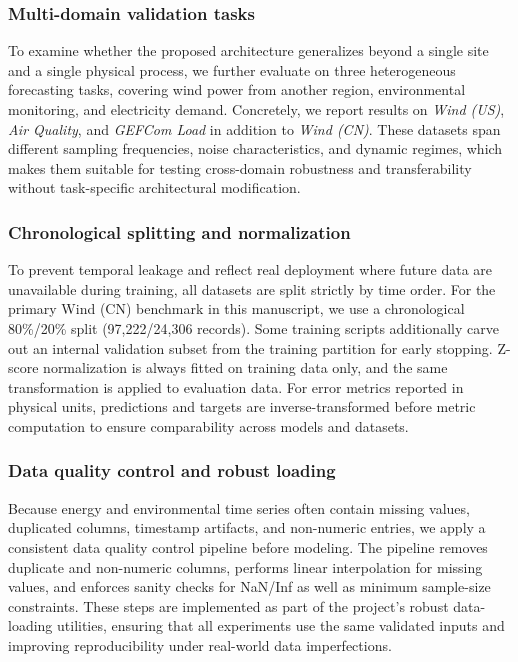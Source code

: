 \documentclass[review,3p,times]{elsarticle}
\begin{document}
\subsubsection{Multi-domain validation tasks}
To examine whether the proposed architecture generalizes beyond a single site and a single physical process, we further evaluate on three heterogeneous forecasting tasks, covering wind power from another region, environmental monitoring, and electricity demand. Concretely, we report results on \emph{Wind (US)}, \emph{Air Quality}, and \emph{GEFCom Load} in addition to \emph{Wind (CN)}. These datasets span different sampling frequencies, noise characteristics, and dynamic regimes, which makes them suitable for testing cross-domain robustness and transferability without task-specific architectural modification.

\subsubsection{Chronological splitting and normalization}
To prevent temporal leakage and reflect real deployment where future data are unavailable during training, all datasets are split strictly by time order. For the primary Wind (CN) benchmark in this manuscript, we use a chronological 80\%/20\% split (97,222/24,306 records). Some training scripts additionally carve out an internal validation subset from the training partition for early stopping. Z-score normalization is always fitted on training data only, and the same transformation is applied to evaluation data. For error metrics reported in physical units, predictions and targets are inverse-transformed before metric computation to ensure comparability across models and datasets.

\subsubsection{Data quality control and robust loading}
Because energy and environmental time series often contain missing values, duplicated columns, timestamp artifacts, and non-numeric entries, we apply a consistent data quality control pipeline before modeling. The pipeline removes duplicate and non-numeric columns, performs linear interpolation for missing values, and enforces sanity checks for NaN/Inf as well as minimum sample-size constraints. These steps are implemented as part of the project's robust data-loading utilities, ensuring that all experiments use the same validated inputs and improving reproducibility under real-world data imperfections.
\end{document}
